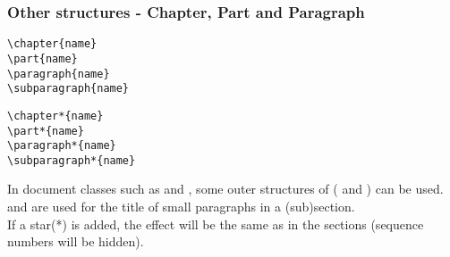 \begin{frame}[fragile]
	\frametitle{Other structures - Chapter, Part and Paragraph}
	\begin{command}
	\begin{multicols}{2}
		\begin{verbatim}
\chapter{name}
\part{name}
\paragraph{name}
\subparagraph{name}
		\end{verbatim}
		\begin{verbatim}
\chapter*{name}
\part*{name}
\paragraph*{name}
\subparagraph*{name}
		\end{verbatim}
	\end{multicols}
	\end{command}
	In document classes such as  and , some outer structures of  (\LC{\chapter} and \LC{\part}) can be used. \\[0.5em]
	\LC{\paragraph} and \LC{\subparagraph} are used for the title of small paragraphs in a (sub)section.\\[0.5em]
	If a star(\alert{*}) is added, the effect will be the same as in the sections (sequence numbers will be hidden).
\end{frame}

